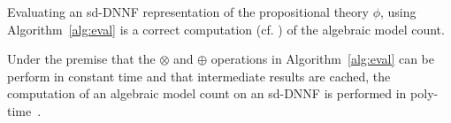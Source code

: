 \begin{theorem}
	\label{theo:amc_ddnnf}
Evaluating an sd-DNNF representation of the propositional theory $\phi$, using Algorithm~\ref{alg:eval}
is a correct computation (cf. \citep[Definition 10]{kimmig2017algebraic}) of the algebraic model count.
\end{theorem}

Under the premise that the $\otimes$ and $\oplus$ operations in Algorithm~\ref{alg:eval} can be perform in constant time and that intermediate results are cached, the computation of an algebraic model count on an sd-DNNF is performed in poly-time~\citep{darwiche2002knowledge}. 


